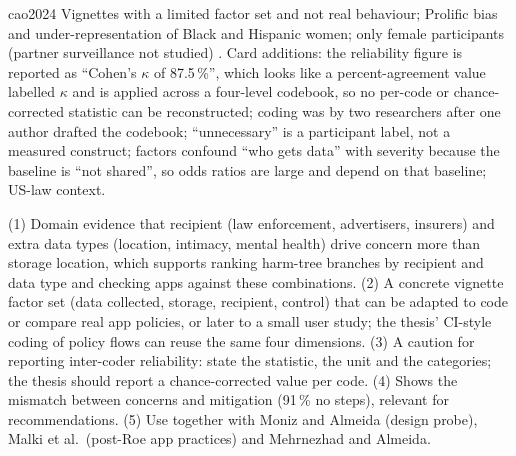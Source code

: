 \begin{papercard}{cao2024}
 Vignettes with a limited factor set and not real behaviour; Prolific bias and under-representation of Black and Hispanic women; only female participants (partner surveillance not studied) . Card additions: the reliability figure is reported as ``Cohen's $\kappa$ of 87.5\,\%'', which looks like a percent-agreement value labelled $\kappa$ and is applied across a four-level codebook, so no per-code or chance-corrected statistic can be reconstructed; coding was by two researchers after one author drafted the codebook; ``unnecessary'' is a participant label, not a measured construct; factors confound ``who gets data'' with severity because the baseline is ``not shared'', so odds ratios are large and depend on that baseline; US-law context.

 (1) Domain evidence that recipient (law enforcement, advertisers, insurers) and extra data types (location, intimacy, mental health) drive concern more than storage location, which supports ranking harm-tree branches by recipient and data type and checking apps against these combinations. (2) A concrete vignette factor set (data collected, storage, recipient, control) that can be adapted to code or compare real app policies, or later to a small user study; the thesis' CI-style coding of policy flows can reuse the same four dimensions. (3) A caution for reporting inter-coder reliability: state the statistic, the unit and the categories; the thesis should report a chance-corrected value per code. (4) Shows the mismatch between concerns and mitigation (91\,\% no steps), relevant for recommendations. (5) Use together with Moniz and Almeida (design probe), Malki et al.\ (post-Roe app practices) and Mehrnezhad and Almeida.
\end{papercard}
